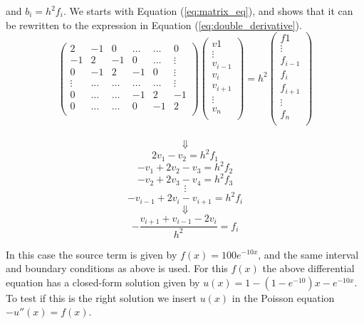 \documentclass[12pt]{article}
\begin{document}
\begin{flushleft}
and $b_i=h^2f_i$. We starts with Equation (\ref{eq:matrix_eq}), and shows that it can be rewritten to the expression in Equation (\ref{eq:double_derivative}).\\
\vspace{5mm}
$$\left(\begin{array}{cccccc}
    2& -1& 0 &\dots   & \dots &0 \\
    -1 & 2 & -1 &0 &\dots &\vdots \\
     0&-1 &2 & -1 & 0 & \vdots \\
     \vdots & \dots   & \dots &\dots   &\dots & \vdots \\
     0&\dots   &\dots  &-1 &2& -1 \\
     0&\dots    &\dots  & 0  &-1 & 2 \\
    \end{array} \right)    
    \left(\begin{array}{c}
    v{1}\\
    \vdots \\
     v_{i-1}\\
     v_{i}\\
     v_{i+1}\\
     \vdots \\
     v_{n}\\
    \end{array} \right)=
    h^{2}\left(\begin{array}{c}
    f{1}\\
    \vdots \\
     f_{i-1}\\
     f_{i}\\
     f_{i+1}\\
     \vdots \\
     f_{n}\\
    \end{array} \right)$$\\
    
$$\Downarrow$$
$$2v_{1}-v_{2} = h^{2}f_{1}$$
$$-v_{1}+2v_{2}-v_{3} = h^{2}f_{2}$$
$$-v_{2}+2v_{3}-v_{4} = h^{2}f_{3}$$
$$\vdots$$
$$-v_{i-1}+2v_{i}-v_{i+1} = h^{2}f_{i}$$
$$\Downarrow$$
$$-\frac{v_{i+1}+v_{i-1}-2v_{i}}{h^{2}} = f_{i}$$

\newpage
In this case the source term is given by $f(x) = 100e^{-10x}$, and the same interval and boundary 
conditions as above is used. For this $f(x)$ the above differential equation has a closed-form solution given by $u(x) = 1-(1-e^{-10})x-e^{-10x}$. To test if this is the right solution we insert $u(x)$ in the Poisson equation $-u''(x)=f(x)$.\\


\end{flushleft}
\end{document}

